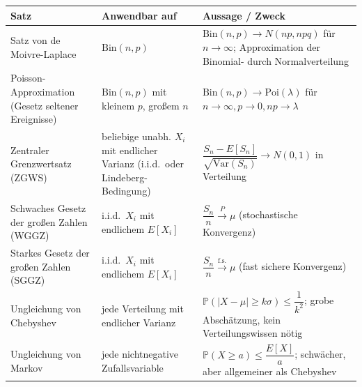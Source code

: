 \begin{mytable}
    \begin{tabular}{|l|p{4cm}|p{6cm}|}
        \hline
        \textbf{Satz} & \textbf{Anwendbar auf} & \textbf{Aussage / Zweck} \\
        \hline
        Satz von de Moivre-Laplace & $\text{Bin}(n,p)$ & $\text{Bin}(n,p) \to N(np,npq)$ für $n\to\infty$; Approximation der Binomial- durch Normalverteilung \\
        \hline
        Poisson-Approximation (Gesetz seltener Ereignisse) & $\text{Bin}(n,p)$ mit kleinem $p$, großem $n$ & $\text{Bin}(n,p) \to \text{Poi}(\lambda)$ für $n\to\infty, p\to 0, np\to\lambda$ \\
        \hline
        Zentraler Grenzwertsatz (ZGWS) & beliebige unabh. $X_i$ mit endlicher Varianz (i.i.d.\ oder Lindeberg-Bedingung) & $\dfrac{S_n - E[S_n]}{\sqrt{\text{Var}(S_n)}} \to N(0,1)$ in Verteilung \\
        \hline
        Schwaches Gesetz der großen Zahlen (WGGZ) & i.i.d.\ $X_i$ mit endlichem $E[X_i]$ & $\dfrac{S_n}{n} \xrightarrow{P} \mu$ (stochastische Konvergenz) \\
        \hline
        Starkes Gesetz der großen Zahlen (SGGZ) & i.i.d.\ $X_i$ mit endlichem $E[X_i]$ & $\dfrac{S_n}{n} \xrightarrow{\text{f.s.}} \mu$ (fast sichere Konvergenz) \\
        \hline
        Ungleichung von Chebyshev & jede Verteilung mit endlicher Varianz & $\mathbb{P}(|X-\mu|\geq k\sigma) \leq \dfrac{1}{k^2}$; grobe Abschätzung, kein Verteilungswissen nötig \\
        \hline
        Ungleichung von Markov & jede nichtnegative Zufallsvariable & $\mathbb{P}(X \geq a) \leq \dfrac{E[X]}{a}$;
        schwächer, aber allgemeiner als Chebyshev %
    \end{tabular}
\end{mytable}